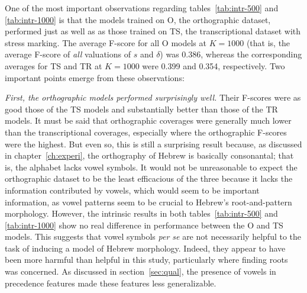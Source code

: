 One of the most important observations regarding tables~\ref{tab:intr-500} and \ref{tab:intr-1000}
 is that the models trained on O, the orthographic dataset, performed just as well as as those trained on TS, the transcriptional dataset
  with stress marking.
  The average F-score for all O 
 models at $K=1000$ (that is, the average F-score of \emph{all} valuations of $s$
   and $\delta$) was 0.386, whereas the corresponding averages for TS and TR at $K=1000$ were 0.399 and 0.354, respectively.
  Two important points emerge from these observations: 
  
\emph{First, the orthographic models performed surprisingly well.} 
Their F-scores were as good those of the TS models and substantially better than those of the
  TR models. It must be said that orthographic coverages were generally much lower than the transcriptional coverages, especially where the orthographic F-scores were the highest.
But even so, this is still a surprising result because, as discussed in chapter~\ref{ch:experi}, 
 the orthography of Hebrew is basically consonantal; that is, the alphabet lacks vowel symbols. 
It would not be unreasonable to expect the orthographic dataset to be the least efficacious of the three because it
lacks the information contributed by vowels, which would seem to be important information, as vowel patterns seem to be crucial to Hebrew's 
root-and-pattern morphology. However, the intrinsic results in both tables~\ref{tab:intr-500} and \ref{tab:intr-1000} 
show no real difference in performance between the O and TS models.
This suggests that vowel symbols \emph{per se} are not necessarily 
helpful to the task of inducing a model of Hebrew morphology. Indeed, 
they appear to have been more harmful than helpful in this study,
particularly where finding roots was concerned. As discussed in section~\ref{sec:qual}, the presence of vowels in precedence features made these features less generalizable. 

